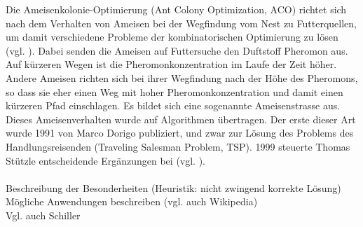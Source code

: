 Die Ameisenkolonie-Optimierung (Ant Colony Optimization, ACO) richtet sich nach dem Verhalten von Ameisen bei der Wegfindung vom Nest zu Futterquellen, um damit verschiedene Probleme der kombinatorischen Optimierung zu lösen (vgl. \cite[S. 1]{sch-koa}). Dabei senden die Ameisen auf Futtersuche den Duftstoff Pheromon aus. Auf kürzeren Wegen ist die Pheromonkonzentration im Laufe der Zeit höher. Andere Ameisen richten sich bei ihrer Wegfindung nach der Höhe des Pheromons, so dass sie eher einen Weg mit hoher Pheromonkonzentration und damit einen kürzeren Pfad einschlagen. Es bildet sich eine sogenannte Ameisenstrasse aus.
Dieses Ameisenverhalten wurde auf Algorithmen übertragen. Der erste dieser Art wurde 1991 von Marco Dorigo publiziert, und zwar zur Lösung des Problems des Handlungsreisenden (Traveling Salesman Problem, TSP). 1999 steuerte Thomas Stützle entscheidende Ergänzungen bei (vgl. \cite{ds-ant}). \\\\

Beschreibung der Besonderheiten (Heuristik: nicht zwingend korrekte Lösung) \\

Mögliche Anwendungen beschreiben (vgl. auch Wikipedia) \\

Vgl. auch Schiller


\vspace*{1cm}
